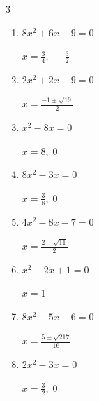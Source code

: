 \begin{multicols}{3}
\begin{enumerate}
  \item $8x^{2}+6x-9=0$

        $\displaystyle x=\frac{3}{4}, \; -\frac{3}{2}$

\columnbreak %

  \item $2x^{2}+2x-9=0$

        $\displaystyle x=\frac{-1\pm \sqrt{19}}{2}$

  \item $x^{2}-8x=0$

        $\displaystyle x=8, \; 0$

  \item $8x^{2}-3x=0$

        $\displaystyle x=\frac{3}{8}, \; 0$

  \item $4x^{2}-8x-7=0$

        $\displaystyle x=\frac{2\pm \sqrt{11}}{2}$

  \item $x^{2}-2x+1=0$

        $\displaystyle x=1$

  \item $8x^{2}-5x-6=0$

        $\displaystyle x=\frac{5\pm \sqrt{217}}{16}$

  \item $2x^{2}-3x=0$

        $\displaystyle x=\frac{3}{2}, \; 0$

\end{enumerate}
\end{multicols}
